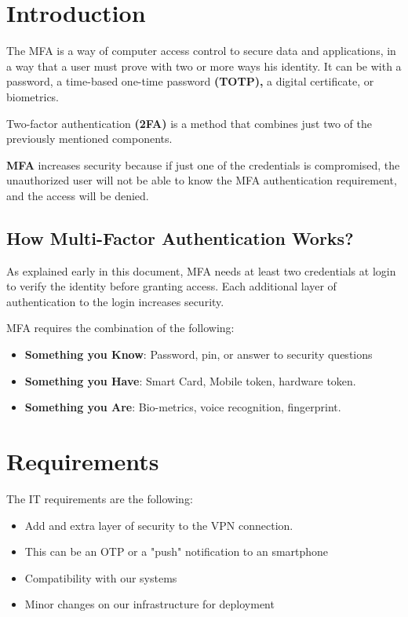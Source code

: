 \section{Introduction}

The MFA is a way of computer access control to secure data and applications,  in a way that a user must prove with two or more ways his identity. 
It can be with a password, a time-based one-time password\textbf{ (TOTP),} a digital certificate, or biometrics.

 Two-factor authentication \textbf{(2FA)} is a method that combines just two of the previously mentioned components.

\textbf{MFA} increases security because if just one of the credentials is compromised, the unauthorized user will not be able to know the MFA authentication requirement, and the access will be denied.


\subsection{How Multi-Factor Authentication Works?
}
As explained early in this document, MFA needs at least two credentials at login to verify the identity before granting access. Each additional layer of authentication to the login increases security.

MFA requires the combination of the following:


\begin{itemize}
\item \textbf{Something you Know}: Password, pin, or answer to security questions
\item \textbf{Something you Have}: Smart Card, Mobile token, hardware token.
\item \textbf{Something you Are}: Bio-metrics, voice recognition, fingerprint.
\end{itemize}

\newpage
\section{Requirements}
 
The IT requirements are the following:

\begin{itemize}
\item Add and extra layer of security to the VPN connection.
\item This can be an OTP or a "push" notification to an smartphone
\item Compatibility with our systems
\item Minor changes on our infrastructure for deployment
\end{itemize}

